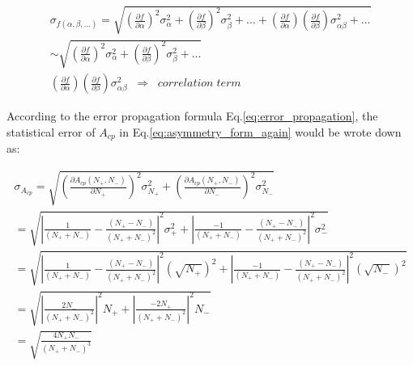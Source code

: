 		\begin{equation}
		\begin{split}
		\sigma_{f(\alpha,\beta,\ldots)} = \sqrt{  (\frac{\partial f}{\partial \alpha})^2 \sigma_{\alpha}^2 + (\frac{\partial f}{\partial \beta})^2 \sigma_{\beta}^2 + \ldots + (\frac{\partial f}{\partial \alpha})(\frac{\partial f}{\partial \beta})\sigma_{\alpha \beta}^2 + \ldots } \\
		\sim \sqrt{  (\frac{\partial f}{\partial \alpha})^2 \sigma_{\alpha}^2 + (\frac{\partial f}{\partial \beta})^2 \sigma_{\beta}^2 + \ldots} \;\;\;\;\;\;\;\;\;\;\;\;\;\;\;\;\;\;\;\;\;\;\;\;\;\;\;\;\;\;\;\;\;\;\; \\
		(\frac{\partial f}{\partial \alpha})(\frac{\partial f}{\partial \beta})\sigma_{\alpha \beta}^2 \;\; \Rightarrow \;\; correlation\;term \;\;\;\;\;\;\;\;\;\;\;\;\;\;\;\;\;\;\;\;\;\;\;\
		\end{split}
		\label{eq:error_propagation}
		\end{equation}
		\FloatBarrier

		According to the error propagation formula Eq.\ref{eq:error_propagation}, the statistical error of $A_{cp}$ in Eq.\ref{eq:asymmetry_form_again} would be wrote down as:

		\begin{equation}
		\begin{split}
		\sigma_{A_{cp}} = \sqrt{ (\frac{\partial A_{cp}(N_+,N_-)}{\partial N_+})^2 \sigma_{N_+}^2 + (\frac{\partial A_{cp}(N_+,N_-)}{\partial N_-})^2 \sigma_{N_-}^2  } \;\;\;\;\;\;\;\;\;\;\;\;\;\;\;\;\;\;\;\;\;\;\;\;\;\;\;\;\;\;\;\;\;\;\; \\
		= \sqrt{ \left\rvert \frac{1}{(N_+ + N_-)} - \frac{(N_+ - N_-)}{(N_+ + N_-)^2} \right\rvert^2 \sigma_+^2 + \left\rvert \frac{-1}{(N_+ + N_-)} - \frac{(N_+ - N_-)}{(N_+ + N_-)^2} \right\rvert^2 \sigma_-^2 } \;\;\;\;\;\;\;\;\;\;\;\;\;\;\;\; \\
		= \sqrt{ \left\rvert \frac{1}{(N_+ + N_-)} - \frac{(N_+ - N_-)}{(N_+ + N_-)^2} \right\rvert^2 (\sqrt{N_+})^2 + \left\rvert \frac{-1}{(N_+ + N_-)} - \frac{(N_+ - N_-)}{(N_+ + N_-)^2} \right\rvert^2 (\sqrt{N_-})^2 } \\
		= \sqrt{ \left\rvert \frac{2N_-}{(N_+ + N_-)^2} \right\rvert^2 N_+ + \left\rvert \frac{-2N_+}{(N_+ + N_-)^2} \right\rvert^2 N_- } \;\;\;\;\;\;\;\;\;\;\;\;\;\;\;\;\;\;\;\;\;\;\;\;\;\;\;\;\;\;\;\;\;\;\; \\
		= \sqrt{ \frac{4N_+ N_-}{( N_+ + N_- )^3}} \;\;\;\;\;\;\;\;\;\;\;\;\;\;\;\;\;\;\;\;\;\;\;\;\;\;\;\;\;\;\;\;\;\;\;\;\;\;\;\;\;\;\;\;\;\;\;\;\;\;\;\;\;\;\;\;\;\;\;\;\;\;\;\;\;\;\;\;\;\;\;\;\;\;\;\;\;
		\end{split}
		\label{eq:error_propagation_Acp}
		\end{equation}
		\FloatBarrier

